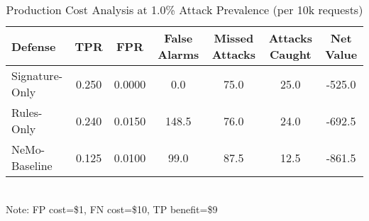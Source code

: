 \begin{table}[h]
\centering
\caption{Production Cost Analysis at 1.0\% Attack Prevalence (per 10k requests)}
\label{tab:cost_analysis}
\begin{tabular}{lcccccc}
\toprule
Defense & TPR & FPR & False Alarms & Missed Attacks & Attacks Caught & Net Value \\
\midrule
Signature-Only & 0.250 & 0.0000 & 0.0 & 75.0 & 25.0 & -525.0 \\
Rules-Only & 0.240 & 0.0150 & 148.5 & 76.0 & 24.0 & -692.5 \\
NeMo-Baseline & 0.125 & 0.0100 & 99.0 & 87.5 & 12.5 & -861.5 \\
\bottomrule
\end{tabular}
\\[0.2cm]
{\small Note: FP cost=\$1, FN cost=\$10, TP benefit=\$9}
\end{table}